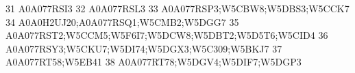 \documentclass{beamer}
\begin{document}
\begin{frame}[fragile]
\begin{itemize}
\begin{Schunk}
\begin{Soutput}
31                                                                                                                                                                                                                                                                                                                                                                     A0A077RSI3
32                                                                                                                                                                                                                                                                                                                                                                     A0A077RSL3
33                                                                                                                                                                                                                                                                                                                                                A0A077RSP3;W5CBW8;W5DBS3;W5CCK7
34                                                                                                                                                                                                                                                                                                                                            A0A0H2UJ20;A0A077RSQ1;W5CMB2;W5DGG7
35                                                                                                                                                                                                                                                                                                                           A0A077RST2;W5CCM5;W5F6I7;W5DCW8;W5DBT2;W5D5T6;W5CID4
36                                                                                                                                                                                                                                                                                                                                  A0A077RSY3;W5CKU7;W5DI74;W5DGX3;W5C309;W5BKJ7
37                                                                                                                                                                                                                                                                                                                                                              A0A077RT58;W5EB41
38                                                                                                                                                                                                                                                                                                                                                A0A077RT78;W5DGV4;W5DIF7;W5DGP3

\end{Soutput}
\end{Schunk}
\end{itemize}
\end{frame}
\end{document}
